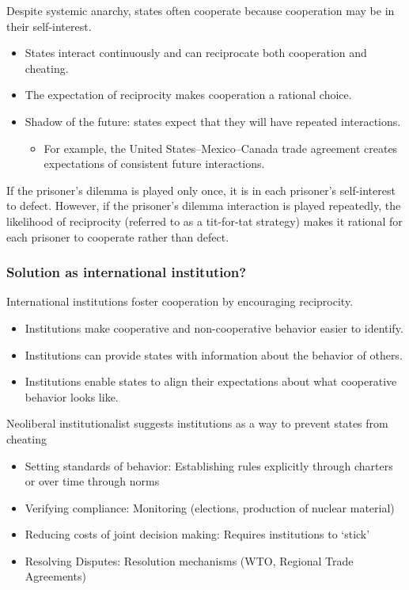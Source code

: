 \documentclass[
]{book}
\providecommand{\tightlist}{%
  \setlength{\itemsep}{0pt}\setlength{\parskip}{0pt}}
\begin{document}
Despite systemic anarchy, states often cooperate because cooperation may be in their self-interest.

\begin{itemize}
\item
  States interact continuously and can reciprocate both cooperation and cheating.
\item
  The expectation of reciprocity makes cooperation a rational choice.
\item
  Shadow of the future: states expect that they will have repeated interactions.

  \begin{itemize}
  \tightlist
  \item
    For example, the United States--Mexico--Canada trade agreement creates expectations of consistent future interactions.
  \end{itemize}
\end{itemize}

If the prisoner's dilemma is played only once, it is in each prisoner's self-interest to defect. However, if the prisoner's dilemma interaction is played repeatedly, the likelihood of reciprocity (referred to as a tit-for-tat strategy) makes it rational for each prisoner to cooperate rather than defect.

\hypertarget{solution-as-international-institution}{%
\subsubsection{Solution as international institution?}\label{solution-as-international-institution}}

International institutions foster cooperation by encouraging reciprocity.

\begin{itemize}
\item
  Institutions make cooperative and non-cooperative behavior easier to identify.
\item
  Institutions can provide states with information about the behavior of others.
\item
  Institutions enable states to align their expectations about what cooperative behavior looks like.
\end{itemize}

Neoliberal institutionalist suggests institutions as a way to prevent states from cheating

\begin{itemize}
\item
  Setting standards of behavior: Establishing rules explicitly through charters or over time through norms
\item
  Verifying compliance: Monitoring (elections, production of nuclear material)
\item
  Reducing costs of joint decision making: Requires institutions to `stick'
\item
  Resolving Disputes: Resolution mechanisms (WTO, Regional Trade Agreements)
\end{itemize}
\end{document}
